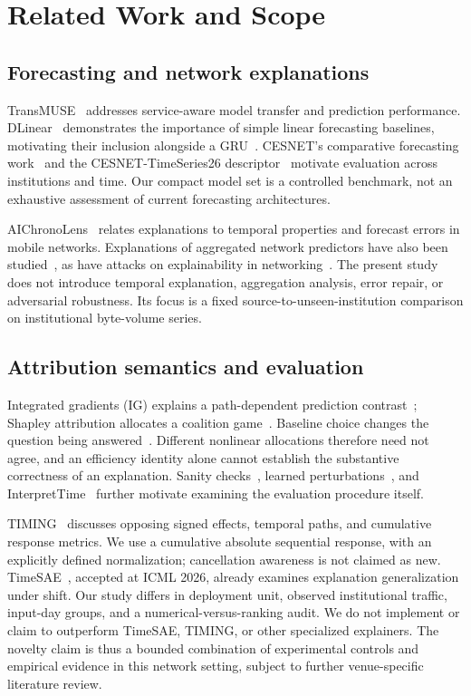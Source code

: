 \documentclass[conference]{IEEEtran}
\begin{document}
\section{Related Work and Scope}
\subsection{Forecasting and network explanations}
TransMUSE~\cite{transmuse} addresses service-aware model transfer and prediction performance. DLinear~\cite{dlinear} demonstrates the importance of simple linear forecasting baselines, motivating their inclusion alongside a GRU~\cite{gru}. CESNET's comparative forecasting work~\cite{comparison} and the CESNET-TimeSeries26 descriptor~\cite{cesnet26} motivate evaluation across institutions and time. Our compact model set is a controlled benchmark, not an exhaustive assessment of current forecasting architectures.

AIChronoLens~\cite{aichrono} relates explanations to temporal properties and forecast errors in mobile networks. Explanations of aggregated network predictors have also been studied~\cite{aggregated}, as have attacks on explainability in networking~\cite{deexp}. The present study does not introduce temporal explanation, aggregation analysis, error repair, or adversarial robustness. Its focus is a fixed source-to-unseen-institution comparison on institutional byte-volume series.

\subsection{Attribution semantics and evaluation}
Integrated gradients (IG) explains a path-dependent prediction contrast~\cite{ig}; Shapley attribution allocates a coalition game~\cite{shap}. Baseline choice changes the question being answered~\cite{manyshap,baselines}. Different nonlinear allocations therefore need not agree, and an efficiency identity alone cannot establish the substantive correctness of an explanation. Sanity checks~\cite{sanity}, learned perturbations~\cite{perturb}, and InterpretTime~\cite{interprettime} further motivate examining the evaluation procedure itself.

TIMING~\cite{timing} discusses opposing signed effects, temporal paths, and cumulative response metrics. We use a cumulative absolute sequential response, with an explicitly defined normalization; cancellation awareness is not claimed as new. TimeSAE~\cite{timesae}, accepted at ICML 2026, already examines explanation generalization under shift. Our study differs in deployment unit, observed institutional traffic, input-day groups, and a numerical-versus-ranking audit. We do not implement or claim to outperform TimeSAE, TIMING, or other specialized explainers. The novelty claim is thus a bounded combination of experimental controls and empirical evidence in this network setting, subject to further venue-specific literature review.
\end{document}
